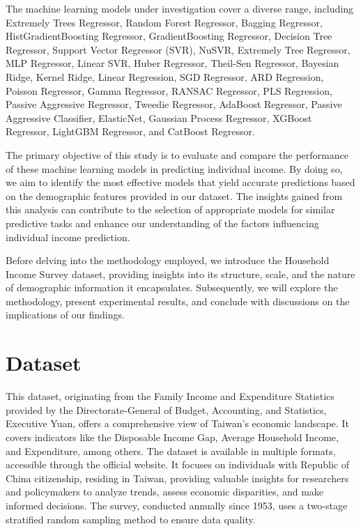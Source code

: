 \documentclass[twocolumn]{article}
\begin{document}
The machine learning models under investigation cover a diverse range, including Extremely Trees Regressor, Random Forest Regressor, Bagging Regressor, HistGradientBoosting Regressor, GradientBoosting Regressor, Decision Tree Regressor, Support Vector Regressor (SVR), NuSVR, Extremely Tree Regressor, MLP Regressor, Linear SVR, Huber Regressor, Theil-Sen Regressor, Bayesian Ridge, Kernel Ridge, Linear Regression, SGD Regressor, ARD Regression, Poisson Regressor, Gamma Regressor, RANSAC Regressor, PLS Regression, Passive Aggressive Regressor, Tweedie Regressor, AdaBoost Regressor, Passive Aggressive Classifier, ElasticNet, Gaussian Process Regressor, XGBoost Regressor, LightGBM Regressor, and CatBoost Regressor.

The primary objective of this study is to evaluate and compare the performance of these machine learning models in predicting individual income. By doing so, we aim to identify the most effective models that yield accurate predictions based on the demographic features provided in our dataset. The insights gained from this analysis can contribute to the selection of appropriate models for similar predictive tasks and enhance our understanding of the factors influencing individual income prediction.

Before delving into the methodology employed, we introduce the Household Income Survey dataset, providing insights into its structure, scale, and the nature of demographic information it encapsulates. Subsequently, we will explore the methodology, present experimental results, and conclude with discussions on the implications of our findings.

\section{Dataset}
This dataset, originating from the Family Income and Expenditure Statistics provided by the Directorate-General of Budget, Accounting, and Statistics, Executive Yuan, offers a comprehensive view of Taiwan's economic landscape. It covers indicators like the Disposable Income Gap, Average Household Income, and Expenditure, among others. The dataset is available in multiple formats, accessible through the official website. It focuses on individuals with Republic of China citizenship, residing in Taiwan, providing valuable insights for researchers and policymakers to analyze trends, assess economic disparities, and make informed decisions. The survey, conducted annually since 1953, uses a two-stage stratified random sampling method to ensure data quality.
\end{document}
